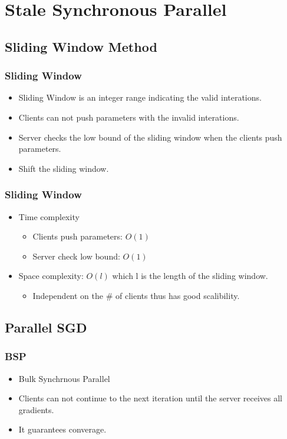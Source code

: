 \section{Stale Synchronous Parallel}

\subsection{Sliding Window Method}
\begin{frame}  
    \frametitle{Sliding Window}
	\begin{itemize}
		\item Sliding Window is an integer range indicating the valid interations.
		\item Clients can not push parameters with the invalid interations. 
		\item Server checks the low bound of the sliding window when the clients push parameters. 
		\item Shift the sliding window. 
	\end{itemize}
\end{frame}


\begin{frame}
    \frametitle{Sliding Window}
	\begin{itemize}
		\item Time complexity
			\begin{itemize}
				\item Clients push parameters: $O(1)$
				\item Server check low bound: $O(1)$
			\end{itemize}
		\item Space complexity: $O(l)$ which l is the length of the sliding window.
			\begin{itemize}
				\item Independent on the \# of clients thus has good scalibility. 
			\end{itemize}
	\end{itemize}
\end{frame}

\subsection{Parallel SGD}
\begin{frame}
    \frametitle{BSP}
    \begin{itemize}
		\item Bulk Synchrnous Parallel
		\item Clients can not continue to the next iteration until the server receives all gradients.
		\item It guarantees converage. 
	\end{itemize}
\end{frame}

